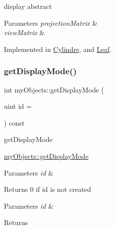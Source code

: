 display abstract 


\begin{DoxyParams}{Parameters}
{\em projection\+Matrix} & \\
\hline
{\em view\+Matrix} & \\
\hline
\end{DoxyParams}


Implemented in \hyperlink{classCylindre_ab4a43877d9fae5e95312027827eb114a}{Cylindre}, and \hyperlink{classLeaf_a8eb757a10f15e34dd72522ae463c760c}{Leaf}.

\mbox{\label{classmyObjects_a5441e2c5d4ad660a73abe3863c81b05a}} 
\subsubsection{\texorpdfstring{get\+Display\+Mode()}{getDisplayMode()}}
{\footnotesize\ttfamily int my\+Objects\+::get\+Display\+Mode (\begin{DoxyParamCaption}\item[{uint}]{id = {} }\end{DoxyParamCaption}) const}



get\+Display\+Mode 

\hyperlink{classmyObjects_a5441e2c5d4ad660a73abe3863c81b05a}{my\+Objects\+::get\+Display\+Mode}


\begin{DoxyParams}{Parameters}
{\em id} & \\
\hline
\end{DoxyParams}
\begin{DoxyReturn}{Returns}
0 if id is not created
\end{DoxyReturn}

\begin{DoxyParams}{Parameters}
{\em id} & \\
\hline
\end{DoxyParams}
\begin{DoxyReturn}{Returns}

\end{DoxyReturn}
\mbox{\label{classmyObjects_a98380353733220fa9d80d149db01732e}} 
